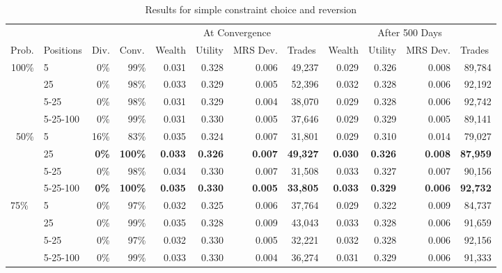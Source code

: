 \documentclass[12pt,a4paper,titlepage]{article}
\begin{document}
\begin{table}
  \begin{tabular}{rl|rr|rrrr|rrrr}

    \multicolumn{1}{l}{} &  & \multicolumn{1}{l}{} & \multicolumn{1}{l}{} & \multicolumn{ 4}{|c|}{At Convergence} & \multicolumn{ 4}{c}{After 500 Days} \\ 
    \multicolumn{1}{l}{Prob.} & Positions & \multicolumn{1}{l}{Div.} & \multicolumn{1}{l|}{Conv.} & \multicolumn{1}{l}{Wealth} & \multicolumn{1}{l}{Utility} & \multicolumn{1}{l}{MRS Dev.} & \multicolumn{1}{l|}{Trades} & \multicolumn{1}{l}{Wealth} & \multicolumn{1}{l}{Utility} & \multicolumn{1}{l}{MRS Dev.} & \multicolumn{1}{l}{Trades} \\ 
    \hline
    \multicolumn{ 1}{r}{100\%} & 5 & 0\% & 99\% & 0.031 & 0.328 & 0.006 & 49,237 & 0.029 & 0.326 & 0.008 & 89,784 \\ 
    \multicolumn{ 1}{r}{} & 25 & 0\% & 98\% & 0.033 & 0.329 & 0.005 & 52,396 & 0.032 & 0.328 & 0.006 & 92,192 \\ 
    \multicolumn{ 1}{r}{} & 5-25 & 0\% & 98\% & 0.031 & 0.329 & 0.004 & 38,070 & 0.029 & 0.328 & 0.006 & 92,742 \\ 
    \multicolumn{ 1}{r}{} & 5-25-100 & 0\% & 99\% & 0.031 & 0.330 & 0.005 & 37,646 & 0.029 & 0.329 & 0.005 & 89,141 \\ 
    \multicolumn{ 1}{r}{50\%} & 5 & 16\% & 83\% & 0.035 & 0.324 & 0.007 & 31,801 & 0.029 & 0.310 & 0.014 & 79,027 \\ 
    \multicolumn{ 1}{r}{} & 25 & \textbf{0\%} & \textbf{100\%} & \textbf{0.033} & \textbf{0.326} & \textbf{0.007} & \textbf{49,327} & \textbf{0.030} & \textbf{0.326} & \textbf{0.008} & \textbf{87,959} \\ 
    \multicolumn{ 1}{r}{} & 5-25 & 0\% & 98\% & 0.034 & 0.330 & 0.007 & 31,508 & 0.033 & 0.327 & 0.007 & 90,156 \\ 
    \multicolumn{ 1}{r}{} & 5-25-100 & \textbf{0\%} & \textbf{100\%} & \textbf{0.035} & \textbf{0.330} & \textbf{0.005} & \textbf{33,805} & \textbf{0.033} & \textbf{0.329} & \textbf{0.006} & \textbf{92,732} \\ 
    \multicolumn{ 1}{l}{75\%} & 5 & 0\% & 97\% & 0.032 & 0.325 & 0.006 & 37,764 & 0.029 & 0.322 & 0.009 & 84,737 \\ 
    \multicolumn{ 1}{r}{} & 25 & 0\% & 99\% & 0.035 & 0.328 & 0.009 & 43,043 & 0.033 & 0.328 & 0.006 & 91,659 \\ 
    \multicolumn{ 1}{l}{} & 5-25 & 0\% & 97\% & 0.032 & 0.330 & 0.005 & 32,221 & 0.032 & 0.328 & 0.006 & 92,156 \\ 
    \multicolumn{ 1}{l}{} & 5-25-100 & 0\% & 99\% & 0.033 & 0.330 & 0.004 & 36,274 & 0.031 & 0.329 & 0.006 & 91,333 \\ 
  \end{tabular}
  \caption{Results for simple constraint choice and reversion}
  \label{tab:bt2}
\end{table}
\end{document}
